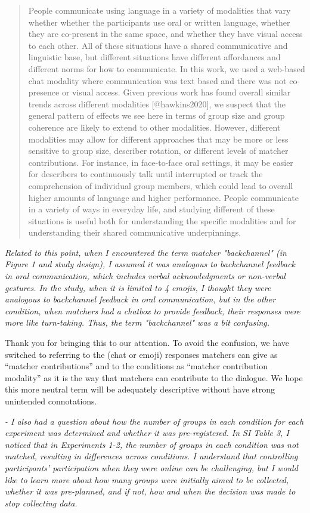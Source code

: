 \documentclass{stanfordletter}
\newcommand{\theysaid}[1]{\begin{leftbar} \noindent 
		\textsl{ #1}\end{leftbar}}
\newcommand{\revised}[1]{\begin{quote}	#1 \end{quote}}
\begin{document}
\begin{letter}{}
          \revised{People communicate using language in a variety of modalities that vary whether whether the participants use oral or written language, whether they are co-present in the same space, and whether they have visual access to each other. All of these situations have a shared communicative and linguistic base, but different situations have different affordances and different norms for how to communicate. In this work, we used a web-based chat modality where communication was text based and there was not co-presence or visual access.  Given previous work has found overall similar trends across different modalities [@hawkins2020], we suspect that the general pattern of effects we see here in terms of group size and group coherence are likely to extend to other modalities. However, different modalities may allow for different approaches that may be more or less sensitive to group size, describer rotation, or different levels of matcher contributions. For instance, in face-to-face oral settings, it may be easier for describers to continuously talk until interrupted or track the comprehension of individual group members, which could lead to overall higher amounts of language and higher performance. People communicate in a variety of ways in everyday life, and studying different of these situations is useful both for understanding the specific modalities and for understanding their shared communicative underpinnings.}
          
          \theysaid{Related to this point, when I encountered the term matcher "backchannel" (in Figure 1 and study design), I assumed it was analogous to backchannel feedback in oral communication, which includes verbal acknowledgments or non-verbal gestures. In the study, when it is limited to 4 emojis, I thought they were analogous to backchannel feedback in oral communication, but in the other condition, when matchers had a chatbox to provide feedback, their responses were more like turn-taking. Thus, the term "backchannel" was a bit confusing.}
          
          Thank you for bringing this to our attention. To avoid the confusion, we have switched to referring to the (chat or emoji) responses matchers can give as ``matcher contributions'' and to the conditions as ``matcher contribution modality'' as it is the way that matchers can contribute to the dialogue.  We hope this more neutral term will be adequately descriptive without have strong unintended connotations. 
          
          \theysaid{- I also had a question about how the number of groups in each condition for each experiment was determined and whether it was pre-registered. In SI Table 3, I noticed that in Experiments 1-2, the number of groups in each condition was not matched, resulting in differences across conditions. I understand that controlling participants' participation when they were online can be challenging, but I would like to learn more about how many groups were initially aimed to be collected, whether it was pre-planned, and if not, how and when the decision was made to stop collecting data.}
          

\end{letter}
\end{document}
